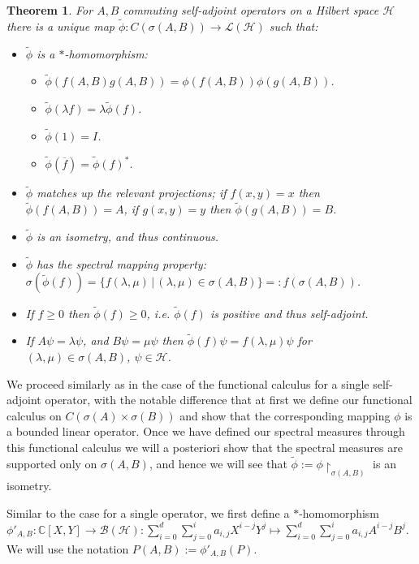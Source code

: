 \documentclass[12pt,oneside]{report}
\newtheorem{thm}{Theorem}[chapter]
\begin{document}
\begin{thm}
    For $A,B$ commuting self-adjoint operators on a Hilbert space $\mathscr{H}$ there is a unique map $\tilde{\phi}: C(\sigma(A,B)) \to \mathscr{L}(\mathscr{H})$ such that:
    \begin{itemize}
        \item $\tilde{\phi}$ is a $*$-homomorphism:
        \begin{itemize}
            \item $\tilde{\phi}(f(A,B)g(A,B)) = \phi(f(A,B))\phi(g(A,B))$.
            \item $\tilde{\phi}(\lambda f) = \lambda \tilde{\phi}(f)$.
            \item $\tilde{\phi}(1) = I$.
            \item $\tilde{\phi}(\overline{f}) = \tilde{\phi}(f)^{*}$.
        \end{itemize}
        \item $\tilde{\phi}$ matches up the relevant projections; if $f(x,y) = x$ then $\tilde{\phi}(f(A,B)) = A$, if $g(x,y) = y$ then $\tilde{\phi}(g(A,B)) = B$.
        \item $\tilde{\phi}$ is an isometry, and thus continuous.
        \item $\tilde{\phi}$ has the spectral mapping property: $\sigma(\tilde{\phi}(f)) = \{ f(\lambda,\mu)  \, | \, (\lambda,\mu) \in \sigma(A,B) \} =: f(\sigma(A,B))$.
        \item If $f \geq 0$ then $\tilde{\phi}(f) \geq 0$, i.e. $\tilde{\phi}(f)$ is positive and thus self-adjoint.
        \item If $A\psi = \lambda \psi$, and $B\psi = \mu \psi$ then $\tilde{\phi}(f)\psi = f(\lambda,\mu)\psi$ for $(\lambda,\mu) \in \sigma(A,B)$, $\psi \in \mathscr{H}$.
    \end{itemize}
\end{thm}

We proceed similarly as in the case of the functional calculus for a single self-adjoint operator, with the notable difference that at first we define our functional calculus on $C(\sigma(A) \times \sigma(B))$ and show that the corresponding mapping $\phi$ is a bounded linear operator. Once we have defined our spectral measures through this functional calculus we will a posteriori show that the spectral measures are supported only on $\sigma(A,B)$, and hence we will see that $\tilde{\phi} := \phi \restriction_{\sigma(A,B)}$ is an isometry.

Similar to the case for a single operator, we first define a $*$-homomorphism $\phi'_{A,B}: \mathbb{C}[X,Y] \to \mathscr{B}(\mathscr{H}): \sum_{i=0}^{d} \sum_{j=0}^{i} a_{i,j} X^{i - j}Y^{j} \mapsto \sum_{i=0}^{d} \sum_{j=0}^{i} a_{i,j} A^{i - j}B^{j}$. We will use the notation $P(A,B) := \phi'_{A,B}(P)$.
\end{document}
